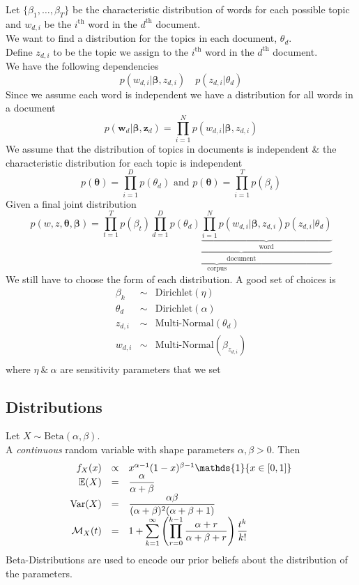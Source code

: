 \documentclass[11pt,a4paper]{article}
\begin{document}
Let $\{\beta_1,\dots,\beta_T\}$ be the characteristic distribution of words for each possible topic and $w_{d,i}$ be the $i^\text{th}$ word in the $d^\text{th}$ document.\\
We want to find a distribution for the topics in each document, $\theta_d$.\\
Define $z_{d,i}$ to be the topic we assign to the $i^\text{th}$ word in the $d^\text{th}$ document.\\
We have the following dependencies
$$p(w_{d,i}|\pmb\beta,z_{d,i})\quad p(z_{d,i}|\theta_d)$$
Since we assume each word is independent we have a distribution for all words in a document
$$p(\textbf{w}_d|\pmb\beta,\textbf{z}_d)=\prod_{i=1}^Np(w_{d,i}|\pmb\beta,z_{d,i})$$
We assume that the distribution of topics in documents is independent \& the characteristic distribution for each topic is independent
$$p(\pmb\theta)=\prod_{i=1}^Dp(\theta_d)\text{ and }p(\pmb\theta)=\prod_{i=1}^Tp(\beta_i)$$
Given a final joint distribution
$$p(w,z,\pmb\theta,\pmb\beta)=\underbrace{\prod_{t=1}^Tp(\beta_t)\underbrace{\prod_{d=1}^Dp(\theta_d)\underbrace{\prod_{i=1}^Np(w_{d,i}|\pmb\beta,z_{d,i})p(z_{d,i}|\theta_d)}_\text{word}}_\text{document}}_\text{corpus}$$
We still have to choose the form of each distribution. A good set of choices is
\[\begin{array}{rcl}
\beta_k&\sim&\text{Dirichlet}(\eta)\\
\theta_d&\sim&\text{Dirichlet}(\alpha)\\
z_{d,i}&\sim&\text{Multi-Normal}(\theta_d)\\
w_{d,i}&\sim&\text{Multi-Normal}(\beta_{z_{d,i}})\\
\end{array}\]
where $\eta\ \&\ \alpha$ are sensitivity parameters that we set

\subsection{Distributions}

Let $X\sim\text{Beta}(\alpha,\beta)$.\\
A \textit{continuous} random variable with shape parameters $\alpha,\beta>0$. Then
\[\begin{array}{rcl}
f_X(x)&\propto&x^{\alpha-1}(1-x)^{\beta-1}\mathds{1}\{x\in[0,1]\}\\
\expect(X)&=&\dfrac{\alpha}{\alpha+\beta}\\
\var(X)&=&\dfrac{\alpha\beta}{(\alpha+\beta)^2(\alpha+\beta+1)}\\
\mathcal{M}_X(t)&=&1+{\displaystyle\sum_{k=1}^\infty\left(\prod_{r=0}^{k-1}\dfrac{\alpha+r}{\alpha+\beta+r}\right)\dfrac{t^k}{k!}}
\end{array}\]
\nb Beta-Distributions are used to encode our prior beliefs about the distribution of the parameters.\\
\end{document}

